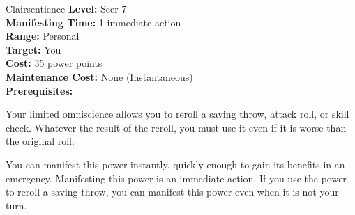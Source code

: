 {Clairsentience}
{
	\textbf{Level:}
	Seer 7\\
	\textbf{Manifesting Time:}
	1 immediate action\\
	\textbf{Range:}
	Personal\\
	\textbf{Target:}
	You\\
	\textbf{Cost:}
	35 power points\\
	\textbf{Maintenance Cost:}
	None (Instantaneous)\\
	\textbf{Prerequisites:}
	\\
}
{
	Your limited omniscience allows you to reroll a saving throw, attack roll, or skill check. Whatever the result of the reroll, you must use it even if it is worse than the original roll.

	You can manifest this power instantly, quickly enough to gain its benefits in an emergency. Manifesting this power is an immediate action. If you use the power to reroll a saving throw, you can manifest this power even when it is not your turn.
}